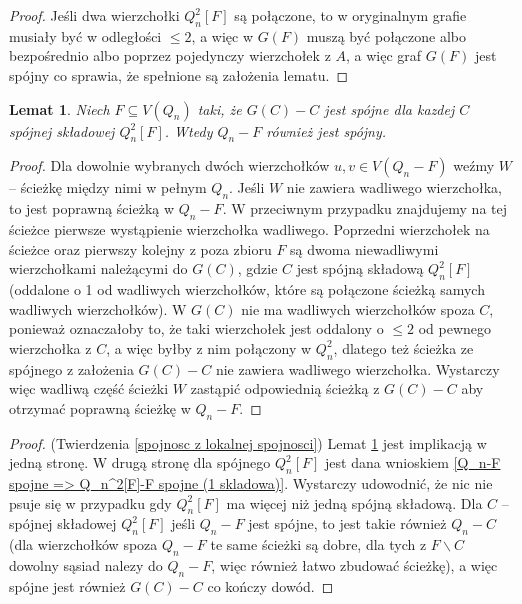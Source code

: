 \documentclass{pracamgr}
\newtheorem{lemma}[theorem]{Lemat}
\begin{document}
     \begin{proof}
      Jeśli dwa wierzchołki $Q_n^2[F]$ są połączone, to w oryginalnym grafie musiały być w odległości $\le 2$, a więc w $G(F)$ muszą być połączone
      albo bezpośrednio albo poprzez pojedynczy wierzchołek z $A$, a więc graf $G(F)$ jest spójny co sprawia,
      że spełnione są założenia lematu.
     \end{proof}
     \begin{lemma}\label{Q_n^2[F]-F spojne => Q_n-F spojne}
      Niech $F\subseteq V(Q_n)$ taki, że $G(C)-C$ jest spójne dla kazdej $C$ spójnej składowej $Q_n^2[F]$. Wtedy $Q_n-F$ również jest spójny.
     \end{lemma}
     \begin{proof}
      Dla dowolnie wybranych dwóch wierzchołków $u,v\in V(Q_n-F)$ weźmy $W$ -- ścieżkę między nimi w pełnym $Q_n$. Jeśli $W$ nie zawiera wadliwego wierzchołka,
      to jest poprawną ścieżką w $Q_n-F$. W przeciwnym przypadku znajdujemy na tej ścieżce pierwsze wystąpienie wierzchołka wadliwego.
      Poprzedni wierzchołek na ścieżce oraz pierwszy kolejny z poza zbioru $F$ są dwoma niewadliwymi wierzchołkami należącymi do $G(C)$, gdzie $C$
      jest spójną składową $Q_n^2[F]$ (oddalone o 1 od wadliwych wierzchołków, które są połączone ścieżką samych wadliwych wierzchołków).
      W $G(C)$ nie ma wadliwych wierzchołków spoza $C$, ponieważ oznaczałoby to, że taki wierzchołek jest oddalony o $\le 2$ od pewnego wierzchołka z $C$,
      a więc byłby z nim połączony w $Q_n^2$, dlatego też ścieżka ze spójnego z założenia $G(C)-C$ nie zawiera wadliwego wierzchołka.
      Wystarczy więc wadliwą część ścieżki $W$ zastąpić odpowiednią ścieżką z $G(C)-C$ aby otrzymać poprawną ścieżkę w $Q_n-F$.
     \end{proof}
     \begin{proof}
      (Twierdzenia \ref{spojnosc z lokalnej spojnosci})\newline
      Lemat \ref{Q_n^2[F]-F spojne => Q_n-F spojne} jest implikacją w jedną stronę.
      W drugą stronę dla spójnego $Q_n^2[F]$ jest dana wnioskiem \ref{Q_n-F spojne => Q_n^2[F]-F spojne (1 skladowa)}.
      Wystarczy udowodnić, że nic nie psuje się w przypadku gdy $Q_n^2[F]$ ma więcej niż jedną spójną składową.
      Dla $C$ -- spójnej składowej $Q_n^2[F]$ jeśli $Q_n-F$ jest spójne, to jest takie również $Q_n-C$
      (dla wierzchołków spoza $Q_n-F$ te same ścieżki są dobre, dla tych z  $F\backslash C$ dowolny sąsiad nalezy do $Q_n-F$, więc również łatwo zbudować ścieżkę),
      a więc spójne jest również $G(C)-C$ co kończy dowód.
     \end{proof}
\end{document}
